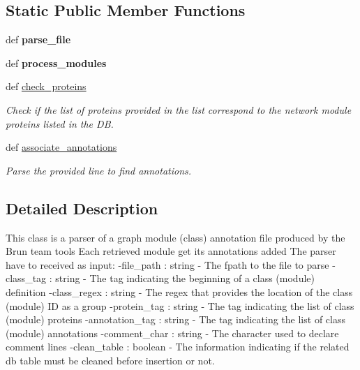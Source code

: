 \subsection*{Static Public Member Functions}
\begin{DoxyCompactItemize}
\item 
\hypertarget{classsrc_1_1fr_1_1tagc_1_1rainet_1_1core_1_1util_1_1parser_1_1NetworkModuleAnnotationParser_1_1NetworkModuleAnnotationParser_a0f615babb23b0308ccbe7ee86ee1d3a0}{def {\bfseries parse\-\_\-file}}\label{classsrc_1_1fr_1_1tagc_1_1rainet_1_1core_1_1util_1_1parser_1_1NetworkModuleAnnotationParser_1_1NetworkModuleAnnotationParser_a0f615babb23b0308ccbe7ee86ee1d3a0}

\item 
\hypertarget{classsrc_1_1fr_1_1tagc_1_1rainet_1_1core_1_1util_1_1parser_1_1NetworkModuleAnnotationParser_1_1NetworkModuleAnnotationParser_aca6c2c2d14d6ca166152de814c3d70fc}{def {\bfseries process\-\_\-modules}}\label{classsrc_1_1fr_1_1tagc_1_1rainet_1_1core_1_1util_1_1parser_1_1NetworkModuleAnnotationParser_1_1NetworkModuleAnnotationParser_aca6c2c2d14d6ca166152de814c3d70fc}

\item 
def \hyperlink{classsrc_1_1fr_1_1tagc_1_1rainet_1_1core_1_1util_1_1parser_1_1NetworkModuleAnnotationParser_1_1NetworkModuleAnnotationParser_ae635f6f43b72b7649c779786dd32779b}{check\-\_\-proteins}
\begin{DoxyCompactList}\small\item\em Check if the list of proteins provided in the list correspond to the network module proteins listed in the D\-B. \end{DoxyCompactList}\item 
def \hyperlink{classsrc_1_1fr_1_1tagc_1_1rainet_1_1core_1_1util_1_1parser_1_1NetworkModuleAnnotationParser_1_1NetworkModuleAnnotationParser_a5239cf8f1385df4b488a50c6b468aff2}{associate\-\_\-annotations}
\begin{DoxyCompactList}\small\item\em Parse the provided line to find annotations. \end{DoxyCompactList}\end{DoxyCompactItemize}


\subsection{Detailed Description}
This class is a parser of a graph module (class) annotation file produced by the Brun team tools Each retrieved module get its annotations added The parser have to received as input\-: -\/file\-\_\-path \-: string -\/ The fpath to the file to parse -\/class\-\_\-tag \-: string -\/ The tag indicating the beginning of a class (module) definition -\/class\-\_\-regex \-: string -\/ The regex that provides the location of the class (module) I\-D as a group -\/protein\-\_\-tag \-: string -\/ The tag indicating the list of class (module) proteins -\/annotation\-\_\-tag \-: string -\/ The tag indicating the list of class (module) annotations -\/comment\-\_\-char \-: string -\/ The character used to declare comment lines -\/clean\-\_\-table \-: boolean -\/ The information indicating if the related db table must be cleaned before insertion or not. 

